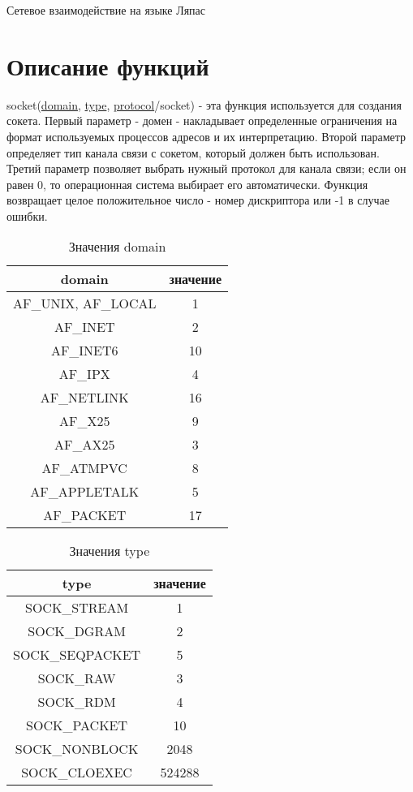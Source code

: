 \documentclass[12t,english,russian]{article}
\begin{document}
\huge
\begin{center}
{Сетевое взаимодействие на языке Ляпас}
\end{center}
\Large
\tableofcontents
\newpage

\large
\section[Описание функций]{Описание функций}
\label{socket}
socket(\hyperref[domain]{domain}, \hyperref[type]{type}, \hyperref[protocol]{protocol}/socket) - эта функция используется для создания сокета. Первый параметр - домен - накладывает определенные ограничения на формат используемых процессов адресов и их интерпретацию. Второй параметр определяет тип канала связи с сокетом, который должен быть использован. Третий параметр позволяет выбрать нужный протокол для канала связи; если он равен 0, то операционная система выбирает его автоматически. Функция возвращает целое положительное число - номер дискриптора или -1 в случае ошибки.

\begin{table}[H]
\caption{\label{domain}Значения domain}
\begin{center}
\begin{tabular}{|c|c|}
\hline
domain & значение \\
\hline
AF\_UNIX, AF\_LOCAL & 1 \\
AF\_INET & 2 \\
AF\_INET6 & 10 \\
AF\_IPX & 4 \\
AF\_NETLINK & 16 \\
AF\_X25 & 9 \\
AF\_AX25 & 3 \\
AF\_ATMPVC & 8 \\
AF\_APPLETALK & 5 \\
AF\_PACKET & 17 \\
\hline
\end{tabular}
\end{center}
\end{table}

\begin{table}[ht]
\caption{\label{type}Значения type}
\begin{center}
\begin{tabular}{|c|c|}
\hline
type & значение \\
\hline
SOCK\_STREAM & 1 \\
SOCK\_DGRAM & 2 \\
SOCK\_SEQPACKET & 5 \\
SOCK\_RAW & 3 \\
SOCK\_RDM & 4 \\
SOCK\_PACKET & 10 \\
SOCK\_NONBLOCK & 2048 \\
SOCK\_CLOEXEC & 524288 \\
\hline
\end{tabular}
\end{center}
\end{table}
\end{document}
